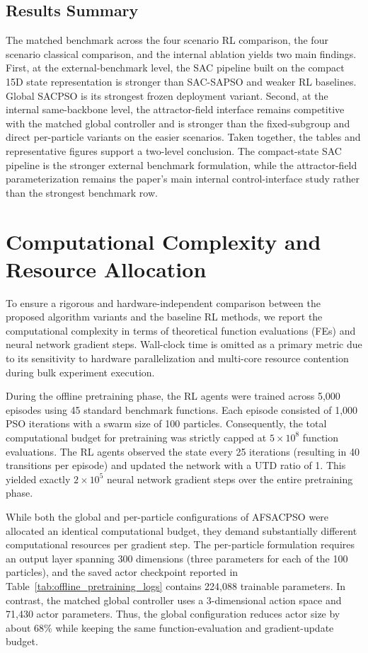 \documentclass[final,5p,times]{elsarticle}
\begin{document}
\subsection{Results Summary}
The matched benchmark across the four scenario RL comparison, the four scenario classical comparison, and the internal ablation yields two main findings.
First, at the external-benchmark level, the SAC pipeline built on the compact 15D state representation is stronger than SAC-SAPSO and weaker RL baselines. Global SACPSO is its strongest frozen deployment variant.
Second, at the internal same-backbone level, the attractor-field interface remains competitive with the matched global controller and is stronger than the fixed-subgroup and direct per-particle variants on the easier scenarios.
Taken together, the tables and representative figures support a two-level conclusion. The compact-state SAC pipeline is the stronger external benchmark formulation, while the attractor-field parameterization remains the paper's main internal control-interface study rather than the strongest benchmark row.


\section{Computational Complexity and Resource Allocation}
\label{sec:complexity}
To ensure a rigorous and hardware-independent comparison between the proposed algorithm variants and the baseline RL methods, we report the computational complexity in terms of theoretical function evaluations (FEs) and neural network gradient steps. Wall-clock time is omitted as a primary metric due to its sensitivity to hardware parallelization and multi-core resource contention during bulk experiment execution.

During the offline pretraining phase, the RL agents were trained across 5,000 episodes using 45 standard benchmark functions. 
Each episode consisted of 1,000 PSO iterations with a swarm size of 100 particles. 
Consequently, the total computational budget for pretraining was strictly capped at $5 \times 10^8$ function evaluations. 
The RL agents observed the state every 25 iterations (resulting in 40 transitions per episode) and updated the network with a UTD ratio of 1. 
This yielded exactly $2 \times 10^5$ neural network gradient steps over the entire pretraining phase.

While both the global and per-particle configurations of AFSACPSO were allocated an identical computational budget, they demand substantially different computational resources per gradient step. 
The per-particle formulation requires an output layer spanning 300 dimensions (three parameters for each of the 100 particles), and the saved actor checkpoint reported in Table~\ref{tab:offline_pretraining_logs} contains 224{,}088 trainable parameters.
In contrast, the matched global controller uses a 3-dimensional action space and 71{,}430 actor parameters.
Thus, the global configuration reduces actor size by about 68\% while keeping the same function-evaluation and gradient-update budget.
\end{document}
